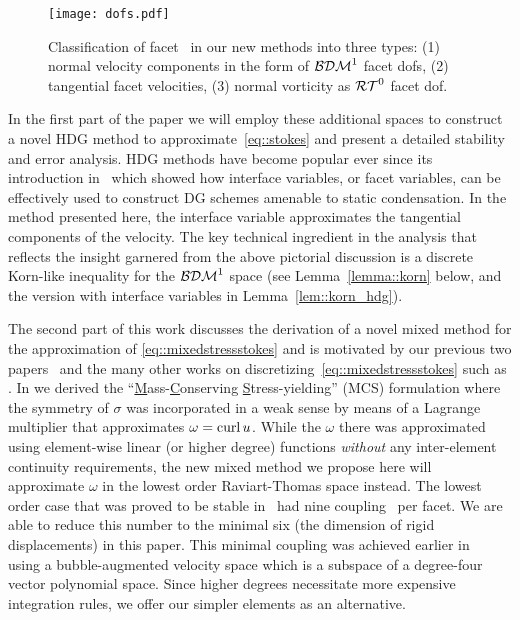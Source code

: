 \begin{figure}
  \centering
  \texttt{[image: dofs.pdf]}
  \caption{Classification of facet \dofs\ in our new methods into three types:
    (1) normal velocity components in the form of  $\mathcal{BDM}^1$ facet dofs,
    (2) tangential facet velocities,
    (3) normal vorticity as $\mathcal{RT}^0$ facet dof. 
  }
  \label{fig::dofs}
\end{figure}

In the first part of the paper we will employ these additional spaces
to construct a novel HDG method to approximate~\eqref{eq::stokes} and
present a detailed stability and error analysis.
HDG methods have become popular ever since its introduction in~\cite{cockburn2009unified} which showed  how interface variables,
or facet variables, 
can be effectively used to construct DG schemes amenable to
static condensation.
In the method presented here, the interface variable approximates the
tangential components of the velocity.
The key technical
ingredient in the analysis that reflects the insight garnered from the
above pictorial discussion is a discrete Korn-like inequality for the
$\mathcal{BDM}^1$ space
(see Lemma~\ref{lemma::korn} below, 
and the version with interface variables  in
Lemma~\ref{lem::korn_hdg}).

The second part of this work discusses the derivation of a novel mixed
method for the approximation of \eqref{eq::mixedstressstokes} and is
motivated by our previous two papers~\cite{mcsI,mcsII} and the many
other works on discretizing~\eqref{eq::mixedstressstokes} such as
\cite{Farhloulcanadian, MR1231323, MR1464150, MR1934446}. In
\cite{mcsII} we derived the ``\underline{M}ass-\underline{C}onserving \underline{S}tress-yielding'' (MCS)
formulation where the symmetry of $\sigma$ was incorporated in a weak sense
by means of a Lagrange multiplier that approximates
$\omega = \operatorname{curl} u$. While the $\omega$ there was approximated using
element-wise linear (or higher degree) functions {\em without} any
inter-element continuity requirements, the new mixed method we propose
here will approximate $\omega$ in the lowest order Raviart-Thomas
space instead.  The lowest order case that was proved to be stable
in~\cite{mcsII} had nine coupling \dofs\ per facet. We are able
to reduce this number to the minimal six (the dimension of rigid
displacements) in this paper.
This minimal coupling was achieved earlier in~\cite{TaiWinth06} using
a bubble-augmented velocity space which is a subspace of a degree-four
vector polynomial space. Since higher degrees necessitate more
expensive integration rules, we offer our simpler elements as an
alternative.


